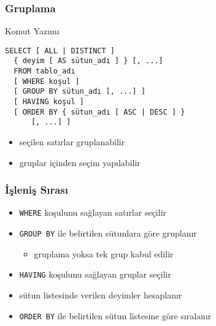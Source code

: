 \documentclass[dvipsnames]{beamer}
\theoremstyle{definition}
\theoremstyle{example}
\theoremstyle{plain}
\begin{document}
\begin{frame}[fragile]
  \frametitle{Gruplama}

  \begin{block}{Komut Yazımı}
    \begin{lstlisting}
SELECT [ ALL | DISTINCT ]
  { deyim [ AS sütun_adı ] } [, ...]
  FROM tablo_adı
  [ WHERE koşul ]
  [ GROUP BY sütun_adı [, ...] ]
  [ HAVING koşul ]
  [ ORDER BY { sütun_adı [ ASC | DESC ] }
      [, ...] ]
    \end{lstlisting}
  \end{block}

  \pause
  \begin{itemize}
    \item seçilen satırlar gruplanabilir
    \item gruplar içinden seçim yapılabilir
  \end{itemize}
\end{frame}

\begin{frame}
  \frametitle{İşleniş Sırası}

  \begin{itemize}
    \item \lstinline!WHERE! koşulunu sağlayan satırlar seçilir

    \pause
    \item \lstinline!GROUP BY! ile belirtilen sütunlara göre gruplanır
    \begin{itemize}
      \item gruplama yoksa tek grup kabul edilir
    \end{itemize}

    \pause
    \item \lstinline!HAVING! koşulunu sağlayan gruplar seçilir

    \pause
    \item sütun listesinde verilen deyimler hesaplanır

    \pause
    \item \lstinline!ORDER BY! ile belirtilen sütun listesine göre sıralanır
  \end{itemize}
\end{frame}
\end{document}
